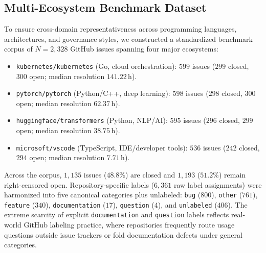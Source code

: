 \documentclass[conference]{IEEEtran}
\begin{document}
\subsection{Multi-Ecosystem Benchmark Dataset}
To ensure cross-domain representativeness across programming languages, architectures, and governance styles, we constructed a standardized benchmark corpus of $N = 2{,}328$ GitHub issues spanning four major ecosystems:
\begin{itemize}
    \item \texttt{kubernetes/kubernetes} (Go, cloud orchestration): $599$ issues ($299$ closed, $300$ open; median resolution $141.22$\,h).
    \item \texttt{pytorch/pytorch} (Python/C++, deep learning): $598$ issues ($298$ closed, $300$ open; median resolution $62.37$\,h).
    \item \texttt{huggingface/transformers} (Python, NLP/AI): $595$ issues ($296$ closed, $299$ open; median resolution $38.75$\,h).
    \item \texttt{microsoft/vscode} (TypeScript, IDE/developer tools): $536$ issues ($242$ closed, $294$ open; median resolution $7.71$\,h).
\end{itemize}
Across the corpus, $1{,}135$ issues ($48.8\%$) are closed and $1{,}193$ ($51.2\%$) remain right-censored open. Repository-specific labels ($6{,}361$ raw label assignments) were harmonized into five canonical categories plus unlabeled: \texttt{bug} ($800$), \texttt{other} ($761$), \texttt{feature} ($340$), \texttt{documentation} ($17$), \texttt{question} ($4$), and \texttt{unlabeled} ($406$). The extreme scarcity of explicit \texttt{documentation} and \texttt{question} labels reflects real-world GitHub labeling practice, where repositories frequently route usage questions outside issue trackers or fold documentation defects under general categories.
\end{document}

